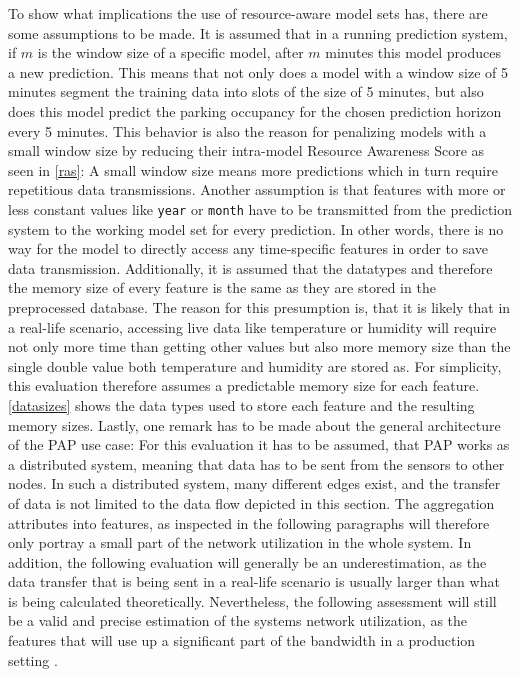 To show what implications the use of resource-aware model sets has, there are some assumptions to be made. It is assumed that in a running prediction system, if $m$ is the window size of a specific model, after $m$ minutes this model produces a new prediction. This means that not only does a model with a window size of 5 minutes segment the training data into slots of the size of 5 minutes, but also does this model predict the parking occupancy for the chosen prediction horizon every 5 minutes. This behavior is also the reason for penalizing models with a small window size by reducing their intra-model Resource Awareness Score as seen in \autoref{ras}: A small window size means more predictions which in turn require repetitious data transmissions. Another assumption is that features with more or less constant values like \texttt{year} or \texttt{month} have to be transmitted from the prediction system to the working model set for every prediction. In other words, there is no way for the model to directly access any time-specific features in order to save data transmission. Additionally, it is assumed that the datatypes and therefore the memory size of every feature is the same as they are stored in the preprocessed database. The reason for this presumption is, that it is likely that in a real-life scenario, accessing live data like temperature or humidity will require not only more time than getting other values but also more memory size than the single double value both temperature and humidity are stored as. For simplicity, this evaluation therefore assumes a predictable memory size for each feature. \autoref{datasizes} shows the data types used to store each feature and the resulting memory sizes. Lastly, one remark has to be made about the general architecture of the PAP use case: For this evaluation it has to be assumed, that PAP works as a distributed system, meaning that data has to be sent from the sensors to other nodes. In such a distributed system, many different edges exist, and the transfer of data is not limited to the data flow depicted in this section. The aggregation attributes into features, as inspected in the following paragraphs will therefore only portray a small part of the network utilization in the whole system. In addition, the following evaluation will generally be an underestimation, as the data transfer that is being sent in a real-life scenario is usually larger than what is being calculated theoretically. Nevertheless, the following assessment will still be a valid and precise estimation of the systems network utilization, as the features that will use up a significant part of the bandwidth in a production setting \cite{sunkel2022}.


